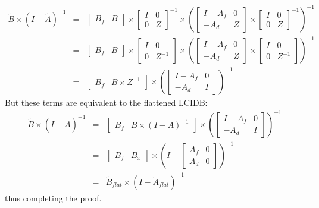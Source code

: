 \begin{eqnarray}
  \tilde{B}\times(I-\tilde{A})^{-1}
  &=& \left[\begin{array}{cc}B_f & B\end{array}\right]\times 
      \left[\begin{array}{cc}I & 0 \\ 0 & Z\end{array}\right]^{-1}\times
\left(
\left[\begin{array}{cc}I-A_f & 0 \\ -A_d & Z\end{array}\right]\times
    \left[\begin{array}{cc}I & 0 \\ 0 & Z\end{array}\right]^{-1}\right)^{-1}\\
  &=&   \left[\begin{array}{cc}B_f & B\end{array}\right]\times 
      \left[\begin{array}{cc}I & 0 \\ 0 & Z^{-1}\end{array}\right]\times
\left(
\left[\begin{array}{cc}I-A_f & 0 \\ -A_d & Z\end{array}\right]\times
\left[\begin{array}{cc}I & 0 \\ 0 & Z^{-1}\end{array}\right]\right)^{-1}\\
 &=& \left[\begin{array}{cc}B_f & B\times Z^{-1}\end{array}\right]\times
\left(\left[\begin{array}{cc}I-A_f & 0 \\ -A_d & I\end{array}\right]\right)^{-1}
\end{eqnarray}
But these terms are equivalent to the flattened LCIDB:
\begin{eqnarray}
  \tilde{B}\times(I-\tilde{A})^{-1} &=&
  \left[\begin{array}{cc}B_f & B\times (I-A)^{-1}\end{array}\right]\times
\left(\left[\begin{array}{cc}I-A_f & 0 \\ -A_d & I\end{array}\right]\right)^{-1} \\
&=& \left[\begin{array}{cc}B_f & B_x\end{array}\right]\times
\left(I-\left[\begin{array}{cc}A_f & 0 \\ A_d & 0\end{array}\right]\right)^{-1}\\
&=& \tilde{B}_{flat}\times(I-\tilde{A}_{flat})^{-1}
\end{eqnarray}
thus completing the proof.

